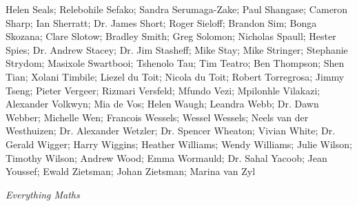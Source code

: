     Helen Seals;
    Relebohile Sefako;
    Sandra Serumaga-Zake;
    Paul Shangase;
    Cameron Sharp;
    Ian Sherratt;
Dr. James Short;
    Roger Sieloff;
    Brandon Sim;
    Bonga Skozana;
    Clare Slotow;
    Bradley Smith;
    Greg Solomon;
    Nicholas Spaull;
Hester Spies;
Dr. Andrew Stacey;
Dr. Jim Stasheff;
    Mike Stay;
    Mike Stringer;
Stephanie Strydom;
    Masixole Swartbooi;
    Tshenolo Tau;
    Tim Teatro;
    Ben Thompson;
    Shen Tian;
    Xolani Timbile;
Liezel du Toit;
    Nicola du Toit;
    Robert Torregrosa;
    Jimmy Tseng;
    Pieter Vergeer;
    Rizmari Versfeld;
    Mfundo Vezi;
    Mpilonhle Vilakazi;
Alexander Volkwyn;
    Mia de Vos;
    Helen Waugh;
    Leandra Webb;
Dr. Dawn Webber;
    Michelle Wen;
Francois Wessels;
Wessel Wessels;
    Neels van der Westhuizen;
Dr. Alexander Wetzler;
Dr. Spencer Wheaton;
    Vivian White;
Dr. Gerald Wigger;
    Harry Wiggins;
    Heather Williams;
    Wendy Williams;
    Julie Wilson;
    Timothy Wilson;
    Andrew Wood;
    Emma Wormauld;
Dr. Sahal Yacoob;
    Jean Youssef;
    Ewald Zietsman;
Johan Zietsman;
    Marina van Zyl







\newpage
\thispagestyle{empty}

{\normalfont\sffamily\fontsize{22}\normalfont\itshape Everything Maths} \par

